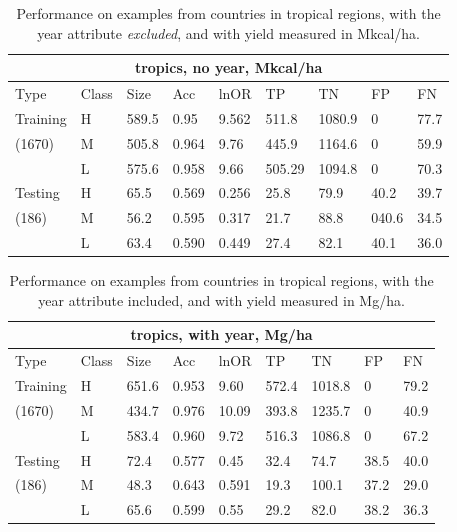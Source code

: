 \documentclass[12pt]{article}
\begin{document}
\begin{table}[h!]
\centering
\begin{tabular}{lllllllll}
\toprule
\multicolumn{9}{c}{\textbf{tropics, no year, Mkcal/ha}} \\
\midrule
Type & Class & Size & Acc & lnOR & TP & TN & FP & FN \\
\midrule
Training & H & 589.5 & 0.95 & 9.562 & 511.8 & 1080.9 & 0 & 77.7  \\
(1670) & M & 505.8 & 0.964 & 9.76 & 445.9 & 1164.6 & 0 & 59.9  \\
& L & 575.6 & 0.958 & 9.66 & 505.29 & 1094.8 & 0 & 70.3  \\
Testing & H & 65.5 & 0.569 & 0.256 & 25.8 & 79.9 & 40.2 & 39.7  \\
(186) & M & 56.2 & 0.595 & 0.317 & 21.7 & 88.8 & 040.6 & 34.5  \\
& L & 63.4 & 0.590 & 0.449 & 27.4 & 82.1 & 40.1 & 36.0  \\
\bottomrule
\end{tabular}
\caption{Performance on examples from countries in tropical regions, with the year attribute \emph{excluded}, and with yield measured in Mkcal/ha.}
\label{k.ny.trop_results}
\end{table}

\begin{table}[h!]
\centering
\begin{tabular}{lllllllll}
\toprule
\multicolumn{9}{c}{\textbf{tropics, with year, Mg/ha}} \\
\midrule
Type & Class & Size & Acc & lnOR & TP & TN & FP & FN\\
\midrule
Training & H & 651.6 & 0.953 & 9.60 & 572.4 & 1018.8 & 0 & 79.2  \\
(1670) & M & 434.7 & 0.976 & 10.09 & 393.8 & 1235.7 & 0 & 40.9  \\
& L & 583.4 & 0.960 & 9.72 & 516.3 & 1086.8 & 0 & 67.2  \\
Testing & H & 72.4 & 0.577 & 0.45 & 32.4 & 74.7 & 38.5 & 40.0  \\
(186) & M & 48.3 & 0.643 & 0.591 & 19.3 & 100.1 & 37.2 & 29.0  \\
& L & 65.6 & 0.599 & 0.55 & 29.2 & 82.0 & 38.2 & 36.3  \\
\bottomrule
\end{tabular}
\caption{Performance on examples from countries in tropical regions, with the year attribute included, and with yield measured in Mg/ha.}
\label{t.wy.trop_results}
\end{table}
\end{document}
